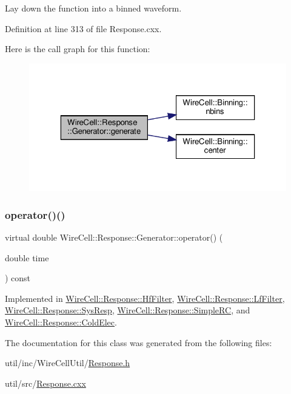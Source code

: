 Lay down the function into a binned waveform. 



Definition at line 313 of file Response.\+cxx.

Here is the call graph for this function\+:
\nopagebreak
\begin{figure}[H]
\begin{center}
\leavevmode
\includegraphics[width=323pt]{class_wire_cell_1_1_response_1_1_generator_a571c13c36686dc25f987b0c189a6ce92_cgraph}
\end{center}
\end{figure}
\mbox{\label{class_wire_cell_1_1_response_1_1_generator_a216d7f7bd22a1a781b6b00bd988e0136}} 
\subsubsection{\texorpdfstring{operator()()}{operator()()}}
{\footnotesize\ttfamily virtual double Wire\+Cell\+::\+Response\+::\+Generator\+::operator() (\begin{DoxyParamCaption}\item[{double}]{time }\end{DoxyParamCaption}) const\hspace{0.3cm}{\ttfamily [pure virtual]}}



Implemented in \hyperlink{class_wire_cell_1_1_response_1_1_hf_filter_afef6eabeb4c0632352c574f6f263405b}{Wire\+Cell\+::\+Response\+::\+Hf\+Filter}, \hyperlink{class_wire_cell_1_1_response_1_1_lf_filter_a476aa965cb6af0ba6dada07d6558c856}{Wire\+Cell\+::\+Response\+::\+Lf\+Filter}, \hyperlink{class_wire_cell_1_1_response_1_1_sys_resp_a765f0e9bb4395c2b36344b07e3ee2762}{Wire\+Cell\+::\+Response\+::\+Sys\+Resp}, \hyperlink{class_wire_cell_1_1_response_1_1_simple_r_c_a161bf08999bc62f35b1b1c5569053e06}{Wire\+Cell\+::\+Response\+::\+Simple\+RC}, and \hyperlink{class_wire_cell_1_1_response_1_1_cold_elec_a488dd88ca0566ba96fbd9df9c6d3e9b7}{Wire\+Cell\+::\+Response\+::\+Cold\+Elec}.



The documentation for this class was generated from the following files\+:\begin{DoxyCompactItemize}
\item 
util/inc/\+Wire\+Cell\+Util/\hyperlink{_response_8h}{Response.\+h}\item 
util/src/\hyperlink{_response_8cxx}{Response.\+cxx}\end{DoxyCompactItemize}
